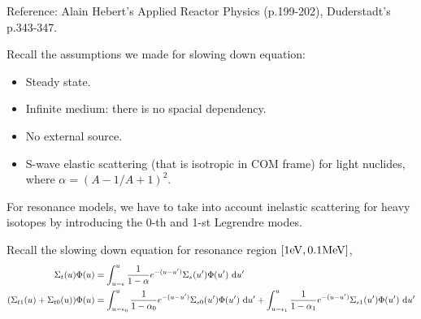 \documentclass{school-22.211-notes}
\date{February 27, 2012}
\begin{document}
\maketitle

\clearpage
{}
Reference: Alain Hebert's Applied Reactor Physics (p.199-202), Duderstadt's p.343-347. 

Recall the assumptions we made for slowing down equation: 
\begin{itemize}
\item Steady state.
\item Infinite medium: there is no spacial dependency. 
\item No external source. 
\item S-wave elastic scattering (that is isotropic in COM frame) for light nuclides, 
  where $\alpha = (A-1/A+1)^2$.
\end{itemize}
For resonance models, we have to take into account inelastic scattering for heavy isotopes by introducing the 0-th and 1-st Legrendre modes. 


Recall the slowing down equation for resonance region $[1\mathrm{eV}, 0.1 \mathrm{MeV}]$, 
\begin{align}
\Sigma_t (u) \Phi(u) &= \int_{u-\epsilon}^u \frac{1}{1 - \alpha} e^{-(u-u')} \Sigma_s (u') \Phi(u') \mbox{ }\mathrm{d} u' \label{resonance-sl-d-eqn} \\
(\Sigma_{t1}(u) + \Sigma_{t0} (u)) \Phi(u) &= \int_{u - \epsilon_0}^u \frac{1}{1 - \alpha_0} e^{-(u-u')} \Sigma_{s0}(u') \Phi(u') \mbox{ }\mathrm{d} u' + \int_{u-\epsilon_1}^u \frac{1}{1 - \alpha_1} e^{-(u-u')} \Sigma_{s1} (u') \Phi(u') \mbox{ }\mathrm{d} u'  
\end{align}
\end{document}

